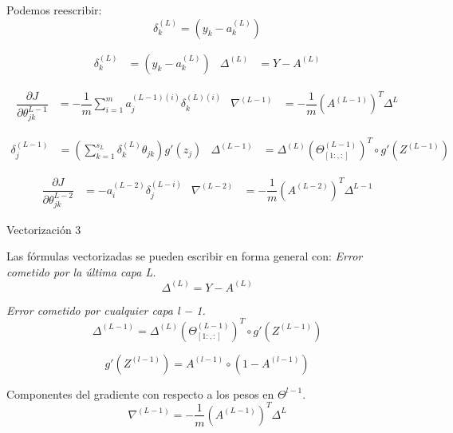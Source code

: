 Podemos reescribir:
\begin{equation}
 \delta_{k}^{(L)}=(y_{k}-a_{k}^{(L)})
\end{equation}

\begin{align*}
\delta_{k}^{(L)}&=(y_{k}-a_{k}^{(L)})           &  \Delta^{(L)}&=Y-A^{(L)}
\end{align*}

\begin{align*}
 \dfrac{\partial J}{\partial\theta_{jk}^{L-1}}&=-\dfrac{1}{m}\sum_{i=1}^{m}a_{j}^{(L-1)(i)}\delta_{k}^{(L)(i)}             &  \nabla^{(L-1)}&=-\dfrac{1}{m}\left(A^{(L-1)}\right)^{T} \Delta^{L}
\end{align*}

\begin{align*}
\delta_{j}^{(L-1)}&=\left(\sum_{k=1}^{s_{L}} \delta_{k}^{(L)}\theta_{jk}\right)g'(z_{j})           &  \Delta^{(L-1)}&=\Delta^{(L)}\left(\Theta_{[1:,:]}^{(L-1)}\right)^{T} \circ g'(Z^{(L-1)})
\end{align*}

\begin{align*}
 \dfrac{\partial J}{\partial\theta_{jk}^{L-2}}&=-a_{i}^{(L-2)}\delta_{j}^{(L-i)}             &  \nabla^{(L-2)}&=-\dfrac{1}{m}\left(A^{(L-2)}\right)^{T} \Delta^{L-1}
\end{align*}

Vectorización 3

Las fórmulas vectorizadas se pueden escribir en forma general con: \emph{Error cometido por la última capa L.}
\begin{equation}
 \Delta^{(L)} = Y-A^{(L)}
\end{equation}

\emph{Error cometido por cualquier capa l − 1.}
\begin{equation}
  \Delta^{(L-1)}=\Delta^{(L)}\left(\Theta_{[1:,:]}^{(L-1)}\right)^{T} \circ g'(Z^{(L-1)})
\end{equation}

\begin{equation}
 g' (Z^{(l-1)}) = A^(l-1) \circ (1-A^{(l-1)})
\end{equation}

Componentes del gradiente con respecto a los pesos en $\Theta^{l-1}$.
\begin{equation}
  \nabla^{(L-1)}=-\dfrac{1}{m}\left(A^{(L-1)}\right)^{T} \Delta^{L}
\end{equation}

